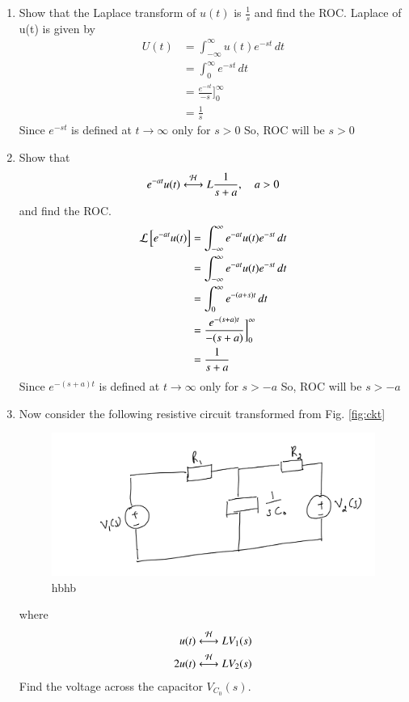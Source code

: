 \documentclass[journal,12pt,twocolumn]{IEEEtran}
\renewcommand\thesection{\arabic{section}}
\begin{document}
\begin{enumerate}[label=\arabic*.,ref=\thesection.\theenumi]
	\item Show that the Laplace transform of $u(t)$ is $\frac{1}{s}$ and find the ROC.
		\solution Laplace of u(t) is given by
		\begin{align}
			U(t)&=\int_{-\infty}^{\infty} u(t) e^{-st}\, dt\\
			&=\int_{0}^{\infty} e^{-st}\, dt\\
			&=\frac{e^{-st}}{-s}\bigg]_0^\infty\\
			&=\frac{1}{s}
		\end{align}
Since $e^{-st}$ is defined at $t\to \infty$ only for $s>0$
So, ROC will be $s>0$
	\item Show that 
		\begin{align}
			e^{-at}u(t) \overset{\mathcal{H}}{ \longleftrightarrow}{L} \frac{1}{s+a}, \quad a > 0
		\end{align}
		and find the ROC.
		\solution
		\begin{align}
			\mathcal{L}{}\left[e^{-at}u(t)\right]&=\int_{-\infty}^{\infty} e^{-at}u(t) e^{-st}\, dt\\
			&=\int_{-\infty}^{\infty} e^{-at}u(t) e^{-st}\, dt\\
			&=\int_{0}^{\infty} e^{-(a+s)t} \, dt\\
			&=\frac{e^{-(s+a)t}}{-(s+a)}\bigg]_0^\infty\\
			&=\frac{1}{s+a}
		\end{align}
		Since $e^{-(s+a)t}$ is defined at $t\to \infty$ only for $s>-a$
		So, ROC will be $s>-a$
	\item Now consider the following resistive circuit transformed from 
			Fig. \ref{fig:ckt}
		\begin{figure}[!ht]
			\centering
			\includegraphics[width=\columnwidth]{figs/lap-ckt.jpg}
			\caption{hbhb}
			\label{fig:lap-ckt}
\end{figure}
		where 
		\begin{align}
			u(t) \overset{\mathcal{H}}{ \longleftrightarrow}{L} V_1(s)
			\\
			2u(t) \overset{\mathcal{H}}{ \longleftrightarrow}{L} V_2(s)
		\end{align}
		Find the voltage across the capacitor $V_{C_0}(s)$.
		

\end{enumerate}
\end{document}
